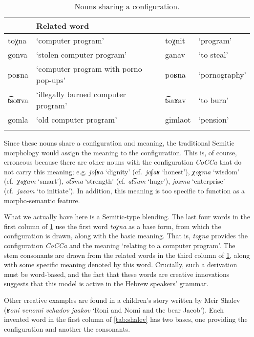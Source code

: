 \documentclass[output=paper,
modfonts
]{LSP/langsci}
\begin{document}
\begin{table}
	\begin{tabular}[t]{llll}
		\lsptoprule
		\multicolumn{2}{l}{CoCCa noun} &
		\multicolumn{2}{l}{Related word} \\
		\midrule
		toχna & `computer program' & toχnit & `program' \\
		gonva & `stolen computer program' &  ganav & `to steal' \\
		poʁna & `computer program with porno pop-ups'  & poʁna & `pornography' \\
		t͡soʁva & `illegally burned computer program' &  t͡saʁav & `to burn' \\
		gomla & `old computer program' & gimlaot & `pension' \\
		\lspbottomrule
	\end{tabular}
	\caption{Nouns sharing a configuration.}
	\label{tab:nconfig}
\end{table}

Since these nouns share a configuration and meaning, the traditional
Semitic morphology would assign the meaning to the configuration. This
is, of course, erroneous because there are other nouns with the
configuration \emph{CoCCa} that do not carry this meaning; e.g.
\emph{jo∫ʁa} `dignity' (cf.\ \emph{ja∫aʁ} `honest'), \emph{χoχma}
`wisdom' (cf.\ \emph{χaχam} `smart'), \emph{ot͡sma} `strength' (cf.
\emph{at͡sum} `huge'), \emph{jozma} `enterprise' (cf.\ \emph{jazam} `to
initiate'). In addition, this meaning is too specific to function as a
morpho-semantic feature.

What we actually have here is a Semitic-type blending. The last four
words in the first column of \cref{tab:nconfig} use the first word \emph{toχna} as a base form, from which
the configuration is drawn, along with the basic meaning. That is,
\emph{toχna} provides the configuration \emph{CoCCa} and the meaning
`relating to a computer program'. The stem consonants are drawn from the
related words in the third column of \cref{tab:nconfig}, along with some specific meaning denoted by this
word. Crucially, such a derivation must be word-based, and the fact that
these words are creative innovations suggests that this model is active
in the Hebrew speakers' grammar.

Other creative examples are found in a children's story written by Meir
Shalev (\emph{ʁoni venomi vehadov jaakov} `Roni and Nomi and the bear
Jacob'). Each invented word in the first column of \cref{tab:shalev} has two bases, one
providing the configuration and another the consonants.
\end{document}
